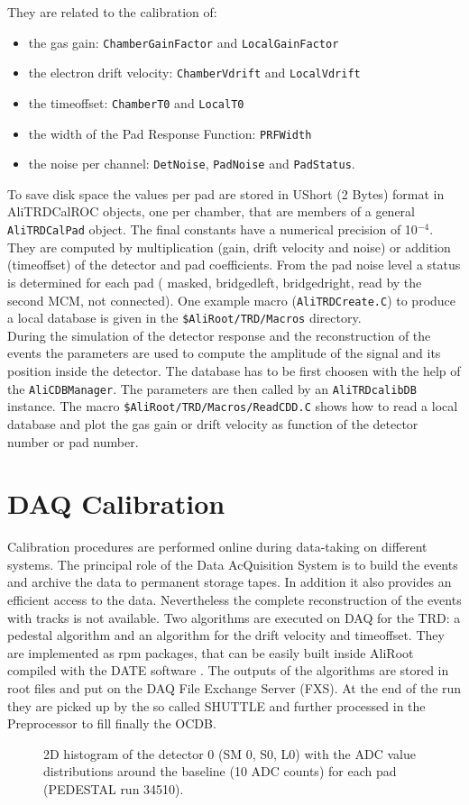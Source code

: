 \documentclass{alicetdr}
\begin{document}
%
They are related to the calibration of:
\begin{itemize}
\item the gas gain: {\tt ChamberGainFactor} and {\tt LocalGainFactor}
\item the electron drift velocity: {\tt ChamberVdrift} and {\tt LocalVdrift}
\item the timeoffset: {\tt ChamberT0} and {\tt LocalT0}
\item the width of the Pad Response Function: {\tt PRFWidth}
\item the noise per channel: {\tt DetNoise}, {\tt PadNoise} and {\tt PadStatus}.
\end{itemize} 
To save disk space the values per pad are stored in UShort (2 Bytes) 
format in AliTRDCalROC objects, one per chamber, that are members of 
a general {\tt AliTRDCalPad} object. The final constants have a 
numerical precision of 10$^{-4}$. They are computed by 
multiplication (gain, drift velocity and noise) or addition (timeoffset) 
of the detector and pad coefficients. From the pad noise level a status 
is determined for each pad ( masked, bridgedleft, bridgedright, read by 
the second MCM, not connected). One example macro ({\tt AliTRDCreate.C}) 
to produce a local database is given in the {\tt \$AliRoot/TRD/Macros} 
directory.\\
During the simulation of the detector response and the reconstruction 
of the events the parameters are used to compute the amplitude of the 
signal and its position inside the detector. The database has to be 
first choosen with the help of the {\tt AliCDBManager}. The parameters 
are then called by an {\tt AliTRDcalibDB} instance. The macro 
{\tt \$AliRoot/TRD/Macros/ReadCDD.C} shows how to read a local database 
and plot the gas gain or drift velocity as function of the detector 
number or pad number.
%
\section{DAQ Calibration}
Calibration procedures are performed online during data-taking on 
different systems. The principal role of the Data AcQuisition System is 
to build the events and archive the data to permanent storage tapes. In 
addition it also provides an efficient access to the data. Nevertheless 
the complete reconstruction of the events with tracks is not available. 
Two algorithms are executed on DAQ for the TRD: a pedestal algorithm and 
an algorithm for the drift velocity and timeoffset. They are implemented 
as rpm packages, that can be easily built inside AliRoot compiled with 
the DATE software \cite{DATE}. The outputs of the algorithms are stored 
in root files and put on the DAQ File Exchange Server (FXS). At the end 
of the run they are picked up by the so called SHUTTLE and further 
processed in the Preprocessor to fill finally the OCDB. 
\begin{figure}[h]
  \centering\mbox{}
  \caption{\label{baselinenoisedet0run34510ex}2D histogram of the 
detector 0 (SM 0, S0, L0) with the ADC value distributions around 
the baseline (10 ADC counts) for each pad (PEDESTAL run 34510).}
\end{figure}
\end{document}
